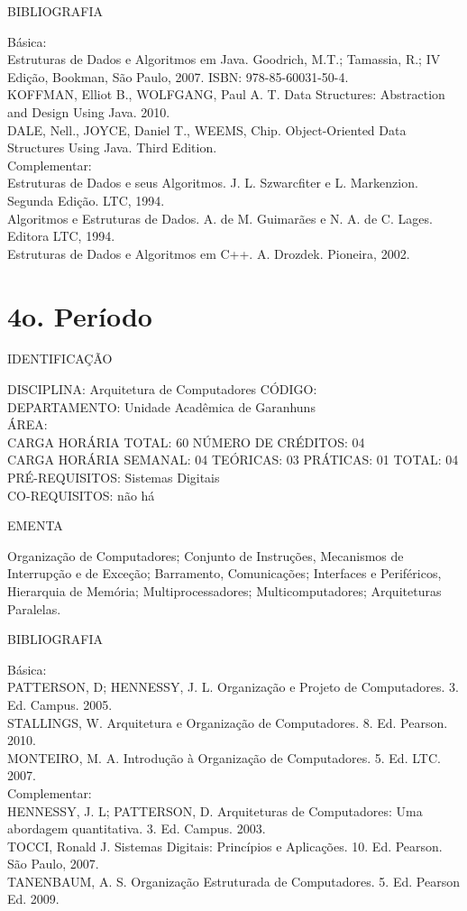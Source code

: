 \documentclass[
	12pt,				%
	openright,			%
  oneside,     %
	a4paper,			%
	english,			%
	french,				%
	spanish,			%
	brazil				%
	]{abntex2}
\begin{document}
\begin{apendicesenv}
BIBLIOGRAFIA 

Básica:\\
Estruturas de Dados e Algoritmos em Java. Goodrich, M.T.; Tamassia, R.;
IV Edição, Bookman, São Paulo, 2007. ISBN: 978-85-60031-50-4.\\
KOFFMAN, Elliot B., WOLFGANG, Paul A. T. Data Structures: Abstraction
and Design Using Java. 2010.\\
DALE, Nell., JOYCE, Daniel T., WEEMS, Chip. Object-Oriented Data
Structures Using Java. Third Edition.\\
Complementar:\\
Estruturas de Dados e seus Algoritmos. J. L. Szwarcfiter e L.
Markenzion. Segunda Edição. LTC, 1994.\\
Algoritmos e Estruturas de Dados. A. de M. Guimarães e N. A. de C.
Lages. Editora LTC, 1994.\\
Estruturas de Dados e Algoritmos em C++. A. Drozdek. Pioneira, 2002.

\newpage 

\section*{4o. Período}

IDENTIFICAÇÃO

DISCIPLINA: Arquitetura de Computadores CÓDIGO:\\ 
DEPARTAMENTO: Unidade Acadêmica de Garanhuns\\
ÁREA:\\
CARGA HORÁRIA TOTAL: 60 NÚMERO DE CRÉDITOS: 04\\
CARGA HORÁRIA SEMANAL: 04 TEÓRICAS: 03 PRÁTICAS: 01 TOTAL: 04 \\
PRÉ-REQUISITOS: Sistemas Digitais\\
CO-REQUISITOS: não há

EMENTA 

Organização de Computadores; Conjunto de Instruções, Mecanismos de
Interrupção e de Exceção; Barramento, Comunicações; Interfaces e
Periféricos, Hierarquia de Memória; Multiprocessadores;
Multicomputadores; Arquiteturas Paralelas.

BIBLIOGRAFIA 

Básica:\\
PATTERSON, D; HENNESSY, J. L. Organização e Projeto de Computadores. 3.
Ed. Campus. 2005.\\
STALLINGS, W. Arquitetura e Organização de Computadores. 8. Ed. Pearson.
2010.\\
MONTEIRO, M. A. Introdução à Organização de Computadores. 5. Ed. LTC.
2007.\\
Complementar:\\
HENNESSY, J. L; PATTERSON, D. Arquiteturas de Computadores: Uma
abordagem quantitativa. 3. Ed. Campus. 2003.\\
TOCCI, Ronald J. Sistemas Digitais: Princípios e Aplicações. 10. Ed.
Pearson. São Paulo, 2007.\\
TANENBAUM, A. S. Organização Estruturada de Computadores. 5. Ed. Pearson Ed. 2009.\\



\end{apendicesenv}
\end{document}
